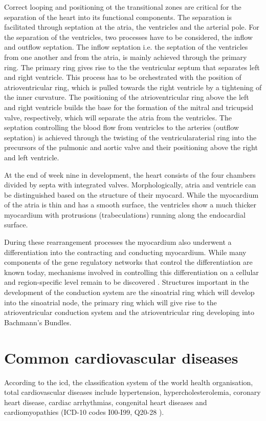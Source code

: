 Correct looping and positioning ot the transitional zones are critical for the separation of the heart into its functional components. The separation is facilitated through septation at the atria, the ventricles and the arterial pole. For the separation of the ventricles, two processes have to be considered, the inflow and outflow septation. The inflow septation i.e. the septation of the ventricles from one another and from the atria, is mainly achieved through the primary ring. The primary ring gives rise to the the ventricular septum that separates left and right ventricle. This process has to be orchestrated with the position of atrioventricular ring, which is pulled towards the right ventricle by a tightening of the inner curvature. The positioning of the atrioventricular ring above the left and right ventricle builds the base for the formation of the mitral and tricupsid valve, respectively, which will separate the atria from the ventricles.  The septation controlling the blood flow from ventricles to the arteries (outflow septation) is achieved through the twisting of the ventricularaterial ring into the precursors of the pulmonic and aortic valve and their positioning above the right and left ventricle.  

At the end of week nine in development, the heart consists of the four chambers divided by septa with integrated valves. Morphologically, atria and ventricle can be distinguished based on the structure of their myocard. While the myocardium of the atria is thin and has a smooth surface, the ventricles show a much thicker myocardium with protrusions (trabeculations) running along the endocardial surface. 

During these rearrangement processes the myocardium also underwent a differentiation into the contracting and conducting myocardium. While many components of the gene regulatory networks that control the differentiation are known today,  mechanisms involved in controlling this differentiation on a cellular and region-specific level remain to be discovered \citep{Christoffels2009,Paige2015,Park2017}. Structures important in the development of the conduction system are the sinoatrial ring which will develop into the sinoatrial node, the primary ring which will give rise to the atrioventricular conduction system and the atrioventricular ring developing into Bachmann's Bundles. 

\section{Common cardiovascular diseases}
\label{subsection:CVD}
According to the \gls{icd}, the classification system of the world health organisation, total cardiovascular diseases include hypertension, hypercholesterolemia, coronary heart disease, cardiac arrhythmias, congenital heart diseases and cardiomyopathies (ICD-10 codes I00-I99, Q20-28 \citep{WHO2016}). 


